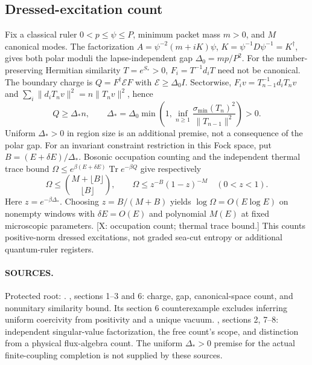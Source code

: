 \subsection*{Dressed-excitation count}
Fix a classical ruler $0<p\leq\psi\leq P$, minimum packet mass $m>0$,
and $M$ canonical modes.  The factorization
$A=\psi^{-2}(m+iK)\psi$, $K=\psi^{-1}D\psi^{-1}=K^\dagger$,
gives both polar moduli the lapse-independent gap $\Delta_0=mp/P^2$.
For the number-preserving Hermitian similarity $T=e^{S_*}>0$,
$F_i=T^{-1}d_iT$ need not be canonical.
The boundary charge is $Q=F^\dagger\mathcal E F$ with
$\mathcal E\geq\Delta_0I$.  Sectorwise,
$F_iv=T_{n-1}^{-1}d_iT_nv$ and
$\sum_i\|d_iT_nv\|^2=n\|T_nv\|^2$, hence
\[
 Q\geq\Delta_*n,\qquad
 \Delta_*=\Delta_0\min\!\left(1,\inf_{n\geq1}
 \frac{\sigma_{\min}(T_n)^2}{\|T_{n-1}\|^2}\right)>0 .
\]
Uniform $\Delta_*>0$ in region size is an additional premise,
not a consequence of the polar gap.
For an invariant constraint restriction in this Fock space, put
$B=(E+\delta E)/\Delta_*$.
Bosonic occupation counting and the independent thermal trace bound
$\Omega\leq e^{\beta(E+\delta E)}\operatorname{Tr}e^{-\beta Q}$
give respectively
\[
 \Omega\leq {M+\lfloor B\rfloor\choose\lfloor B\rfloor},
 \qquad \Omega\leq z^{-B}(1-z)^{-M}\quad(0<z<1).
\]
Here $z=e^{-\beta\Delta_*}$.  Choosing $z=B/(M+B)$ yields
$\log\Omega=O(E\log E)$ on nonempty windows with $\delta E=O(E)$
and polynomial $M(E)$ at fixed microscopic parameters.
[X: occupation count; thermal trace bound.]
This counts positive-norm dressed excitations, not graded sea-cut
entropy or additional quantum-ruler registers.

\paragraph*{SOURCES.}
\begingroup\footnotesize
Protected root:
.
,
sections 1--3 and 6: charge, gap, canonical-space count, and
nonunitary similarity bound.  Its section 6 counterexample excludes
inferring uniform coercivity from positivity and a unique vacuum.
,
sections 2, 7--8: independent singular-value factorization, the free
count's scope, and distinction from a physical flux-algebra count.
The uniform $\Delta_*>0$ premise for the actual finite-coupling completion
is not supplied by these sources.
\endgroup
